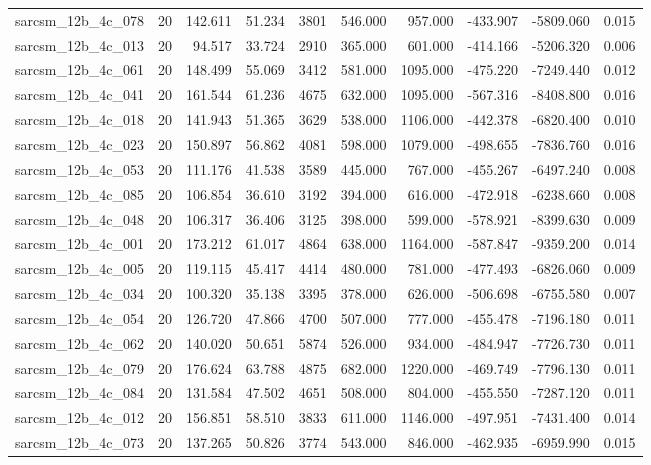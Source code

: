 \begin{tabular}{lrrrrrrrrr}
sarcsm\_12b\_4c\_078 & 20 & 142.611 & 51.234 & 3801 & 546.000 & 957.000 & -433.907 & -5809.060 & 0.015 \\
sarcsm\_12b\_4c\_013 & 20 & 94.517 & 33.724 & 2910 & 365.000 & 601.000 & -414.166 & -5206.320 & 0.006 \\
sarcsm\_12b\_4c\_061 & 20 & 148.499 & 55.069 & 3412 & 581.000 & 1095.000 & -475.220 & -7249.440 & 0.012 \\
sarcsm\_12b\_4c\_041 & 20 & 161.544 & 61.236 & 4675 & 632.000 & 1095.000 & -567.316 & -8408.800 & 0.016 \\
sarcsm\_12b\_4c\_018 & 20 & 141.943 & 51.365 & 3629 & 538.000 & 1106.000 & -442.378 & -6820.400 & 0.010 \\
sarcsm\_12b\_4c\_023 & 20 & 150.897 & 56.862 & 4081 & 598.000 & 1079.000 & -498.655 & -7836.760 & 0.016 \\
sarcsm\_12b\_4c\_053 & 20 & 111.176 & 41.538 & 3589 & 445.000 & 767.000 & -455.267 & -6497.240 & 0.008 \\
sarcsm\_12b\_4c\_085 & 20 & 106.854 & 36.610 & 3192 & 394.000 & 616.000 & -472.918 & -6238.660 & 0.008 \\
sarcsm\_12b\_4c\_048 & 20 & 106.317 & 36.406 & 3125 & 398.000 & 599.000 & -578.921 & -8399.630 & 0.009 \\
sarcsm\_12b\_4c\_001 & 20 & 173.212 & 61.017 & 4864 & 638.000 & 1164.000 & -587.847 & -9359.200 & 0.014 \\
sarcsm\_12b\_4c\_005 & 20 & 119.115 & 45.417 & 4414 & 480.000 & 781.000 & -477.493 & -6826.060 & 0.009 \\
sarcsm\_12b\_4c\_034 & 20 & 100.320 & 35.138 & 3395 & 378.000 & 626.000 & -506.698 & -6755.580 & 0.007 \\
sarcsm\_12b\_4c\_054 & 20 & 126.720 & 47.866 & 4700 & 507.000 & 777.000 & -455.478 & -7196.180 & 0.011 \\
sarcsm\_12b\_4c\_062 & 20 & 140.020 & 50.651 & 5874 & 526.000 & 934.000 & -484.947 & -7726.730 & 0.011 \\
sarcsm\_12b\_4c\_079 & 20 & 176.624 & 63.788 & 4875 & 682.000 & 1220.000 & -469.749 & -7796.130 & 0.011 \\
sarcsm\_12b\_4c\_084 & 20 & 131.584 & 47.502 & 4651 & 508.000 & 804.000 & -455.550 & -7287.120 & 0.011 \\
sarcsm\_12b\_4c\_012 & 20 & 156.851 & 58.510 & 3833 & 611.000 & 1146.000 & -497.951 & -7431.400 & 0.014 \\
sarcsm\_12b\_4c\_073 & 20 & 137.265 & 50.826 & 3774 & 543.000 & 846.000 & -462.935 & -6959.990 & 0.015 \\

\end{tabular}
